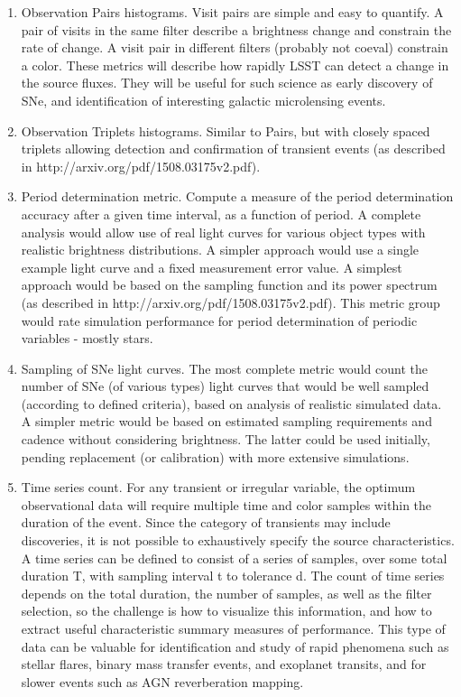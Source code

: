 \begin{enumerate}
\item Observation Pairs histograms.  Visit pairs are simple and easy to
quantify.  A pair of visits in the same filter describe a brightness
change and constrain the rate of change. A visit pair in different
filters (probably not coeval) constrain a color.  These metrics will
describe how rapidly LSST can detect a change in the source fluxes. They
will be useful for such science as early discovery of SNe, and
identification of interesting galactic microlensing events.

\item Observation Triplets histograms. Similar to Pairs, but with
closely spaced triplets allowing detection and confirmation of transient
events (as described in http://arxiv.org/pdf/1508.03175v2.pdf).

\item Period determination metric.  Compute a measure of the period
determination accuracy after a given time interval, as a function of
period. A complete analysis would allow use of real light curves for
various object types with realistic brightness distributions.  A simpler
approach would use a single example light curve and a fixed measurement
error value. A simplest approach would be based on the sampling function
and its power spectrum (as described in
http://arxiv.org/pdf/1508.03175v2.pdf).  This metric group would rate
simulation performance for period determination of periodic variables -
mostly stars.

\item Sampling of SNe light curves.  The most complete metric would
count the number of SNe (of various types) light curves that would be
well sampled (according to defined criteria), based on analysis of
realistic simulated data.  A simpler metric would be based on estimated
sampling requirements and cadence without considering brightness. The
latter could be used initially, pending replacement (or calibration)
with more extensive simulations.

\item Time series count. For any transient or irregular variable, the
optimum observational data will require multiple time and color samples
within the duration of the event. Since the category of transients may
include discoveries, it is not possible to exhaustively specify the
source characteristics. A time series can be defined to consist of a
series of samples, over some total duration T, with sampling interval t
to tolerance d. The count of time series depends on the total duration,
the number of samples, as well as the filter selection, so the challenge
is how to visualize this information, and how to extract useful
characteristic summary measures of performance.  This type of data can
be valuable for identification and study of rapid phenomena such as
stellar flares, binary mass transfer events, and exoplanet transits, and
for slower events such as AGN reverberation mapping.

\end{enumerate}

